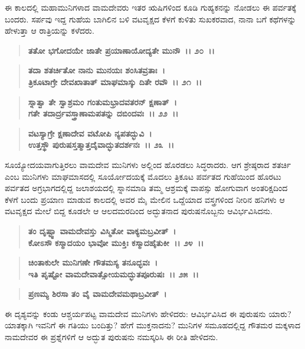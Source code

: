 ಈ ಕಾಲದಲ್ಲಿ ಮಹಾಮುನಿಗಳಾದ ವಾಮದೇವರು ಇತರ ಋಷಿಗಳಿಂದ ಕೂಡಿ ಗುಹ್ಯಕನನ್ನು ನೋಡಲು ಈ ಪರ್ವತಕ್ಕೆ ಬಂದರು. ಸರ್ಪವು ಇದ್ದ ಗುಹೆಯ ಬಾಗಿಲಿನ ಬಳಿ ವಟವೃಕ್ಷದ ಕೆಳಗೆ ಕುಳಿತು ಸುಖಕರವಾದ, ನಾನಾ ಬಗೆ ಕಥೆಗಳನ್ನು ಹೇಳುತ್ತಾ ಆ ರಾತ್ರಿಯನ್ನು ಕಳೆದರು.

\begin{verse}
\textbf{ತತೋ ಭಗೋದಯೇ ಜಾತೇ ಪ್ರಯಾಣಾಯೋದ್ಯತೇ ಮುನೌ~।। ೨೦~।।} 
\end{verse}

\begin{verse}
\textbf{ತದಾ ಶತರ್ಚಿತೋ ನಾನು ಮುನಯಃ ಶಂಸಿತವ್ರತಾಃ~।}\\\textbf{ತ್ರಿಕೂಟಾಗ್ರೇ ದೇವಖಾತಾತ್ ಮಾಘಮಾಸ್ಕು ದಿತೇ ರವೌ~।। ೨೧~।। }
\end{verse}

\begin{verse}
\textbf{ಸ್ನಾತ್ವಾ ತೇ ಸ್ವಾಶ್ರಮಂ ಗಂತುಮಭ್ರಾದವತರನ್ ಕ್ಷಣಾತ್~।}\\\textbf{ಗತೇ ತದಾರ್ದ್ರವಸ್ತ್ರಾಣಾಮಪತನ್ನು ದಬಿಂದವಃ~।। ೨೨~।। }
\end{verse}

\begin{verse}
\textbf{ವಟಸ್ಯಾಗ್ರೇ ಕ್ಷಣಾದೇವ ವಟೋಪಿ ನ್ಯಪತದ್ಭುವಿ~।}\\\textbf{ಉತ್ತಸ್ಥೌ ಪುರುಷಸ್ತತ್ಮಾತ್ತದೈವಾದ್ಭುತದರ್ಶನಃ~।। ೨೩~।।}
\end{verse}

ಸೂಯ್ಯೋದಯವಾಗುತ್ತಿರಲು ವಾಮದೇವ ಮುನಿಗಳು ಅಲ್ಲಿಂದ ಹೊರಡಲು ಸಿದ್ಧ\-ರಾದರು. ಆಗ ಶ್ರೇಷ್ಠರಾದ ಶತರ್ಚಿ ಎಂಬ ಮುನಿಗಳು ಮಾಘಮಾಸದಲ್ಲಿ ಸೂರ್ಯೋದಯಕ್ಕೆ ಮೊದಲು ತ್ರಿಕೂಟ ಪರ್ವತದ ಗುಹೆಯಿಂದ ಹೊರಟು ಪರ್ವತದ ಅಗ್ರಭಾಗದಲ್ಲಿದ್ದ ಜಲಾಶಯದಲ್ಲಿ ಸ್ನಾನಮಾಡಿ ತಮ್ಮ ಆಶ್ರಮಕ್ಕೆ ವಾಪಸ್ಸು ಹೋಗುವಾಗ ಅಂತರಿಕ್ಷದಿಂದ ಕೆಳಗೆ ಬಂದು ಪ್ರಯಾಣ ಮಾಡುವ ಕಾಲದಲ್ಲಿ ಅವರ ಮೈ ಮೇಲಿನ ಒದ್ದೆಯಾದ ವಸ್ತ್ರಗಳಿಂದ ನೀರಿನ ಹನಿಗಳು ಆ ವಟವೃಕ್ಷದ ಮೇಲೆ ಬಿದ್ದ ಕೂಡಲೇ ಆ ಆಲದಮರದಿಂದ ಅದ್ಭುತನಾದ ಪುರುಷನೊಬ್ಬನು ಆವಿರ್ಭವಿಸಿದನು.

\begin{verse}
\textbf{ತಂ ದೃಷ್ಟ್ವಾ ವಾಮದೇವಸ್ತು ವಿಸ್ಮಿತೋ ವಾಕ್ಯಮಬ್ರವೀತ್~।}\\\textbf{ಕೋಽಸೌ ಕಸ್ಮಾದಯಂ ಭಾವೋ ಮುಕ್ತಿಃ ಕಸ್ಮಾದಹೈತುಕೀ~।। ೨೪~।। }
\end{verse}

\begin{verse}
\textbf{ಚಿಂತಾಕುಲೇ ಮುನಿಗಣೇ ಗೌತಮಸ್ಯ ತನೂದ್ಭವಃ~।}\\\textbf{ಇತಿ ಪೃಷ್ಟೋ ವಾಮದೇವಾತ್ಸೋಯಮದ್ಭುತಪೂರುಷಃ~।। ೨೫~।।}
\end{verse}

\begin{verse}
\textbf{ಪ್ರಣಮ್ಯ ಶಿರಸಾ ತಂ ವೈ ವಾಮದೇವಮಥಾಬ್ರವೀತ್~।}
\end{verse}

ಈ ದೃಶ್ಯವನ್ನು ಕಂಡು ಆಶ್ಚರ್ಯಪಟ್ಟ ವಾಮದೇವ ಮುನಿಗಳು ಹೇಳಿದರು: ಆವಿರ್ಭವಿಸಿದ ಈ ಪುರುಷನು ಯಾರು? ಯಾತಕ್ಕಾಗಿ ಇವನಿಗೆ ಈ ಗತಿಯು ಬಂದಿತ್ತು? ಹೇಗೆ ಮುಕ್ತನಾದನು? ಮುನಿಗಳ ಸಮೂಹದಲ್ಲಿದ್ದ ಗೌತಮರ ಮಕ್ಕಳಾದ ನಾಮದೇವರ ಈ ಪ್ರಶ್ನೆಗಳಿಗೆ ಆ ಅದ್ಭುತ ಪುರುಷನು ನಮಸ್ಕರಿಸಿ ಈ ರೀತಿ ಹೇಳಿದನು.

